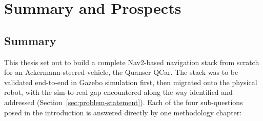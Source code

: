 \chapter{Summary and Prospects}
\label{ch:summary}

\section{Summary}
\label{sec:summary}

This thesis set out to build a complete Nav2-based navigation stack
from scratch for an Ackermann-steered vehicle, the Quanser QCar. The
stack was to be validated end-to-end in Gazebo simulation first, then
migrated onto the physical robot, with the sim-to-real gap encountered
along the way identified and addressed
(Section~\ref{sec:problem-statement}). Each of the four sub-questions
posed in the introduction is answered directly by one methodology
chapter:

